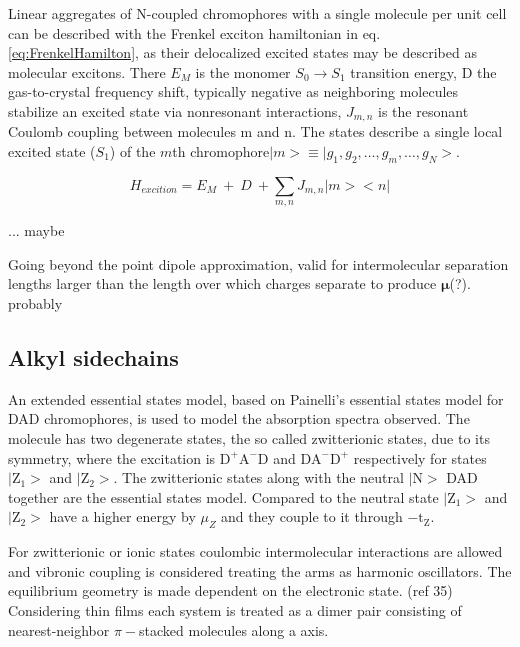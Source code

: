 \documentclass{article}
\begin{document}
\begin{multicols}{2}
Linear aggregates of N-coupled chromophores with a single molecule per unit cell can be described with the Frenkel exciton hamiltonian in eq. \ref{eq:FrenkelHamilton}, as their delocalized excited states may be described as molecular excitons. There $E_M$ is the monomer $S_0 \rightarrow S_1$ transition energy, D the gas-to-crystal frequency shift, typically negative as neighboring molecules stabilize an excited state via nonresonant interactions, $J_{m,n}$ is the resonant Coulomb coupling between molecules m and n. The states describe a single local excited state ($S_1$) of the $m$th chromophore$|m> \equiv |g_1, g_2, \dots, g_m, \dots, g_N>$.\cite{Hestand2018}

\begin{equation}\label{eq:FrenkelHamilton}
H_{excition} = E_M\:+\:D\:+\sum_{m,n}J_{m,n}|m><n|
\end{equation}

... maybe


Going beyond the point dipole approximation, valid for intermolecular separation lengths larger than the length over which charges separate to produce $\boldsymbol{\mu}$(?). probably \cite{Hestand2018}



\subsection{Alkyl sidechains}
An extended essential states model, based on Painelli's essential states model for DAD chromophores, is used to model the absorption spectra observed. The molecule has two degenerate states, the so called zwitterionic states, due to its symmetry, where the excitation is $\mathrm{D^+A^-D}$ and $\mathrm{DA^-D^+}$ respectively for states $\mathrm{|Z_1>}$ and $\mathrm{|Z_2>}$. The zwitterionic states along with the neutral $\mathrm{|N>}$ DAD together are the essential states model. Compared to the neutral state $\mathrm{|Z_1>}$ and $\mathrm{|Z_2>}$ have a higher energy by $\mu _Z$ and they couple to it through $\mathrm{-t_Z}$.\cite{Balzer2022}


For zwitterionic or ionic states coulombic intermolecular interactions are allowed and vibronic coupling is considered treating the arms as harmonic oscillators. The equilibrium geometry is made dependent on the electronic state. (ref 35) Considering thin films each system is treated as a dimer pair consisting of nearest-neighbor $\pi-$stacked molecules along a axis. \cite{Balzer2022}


\end{multicols}
\end{document}

